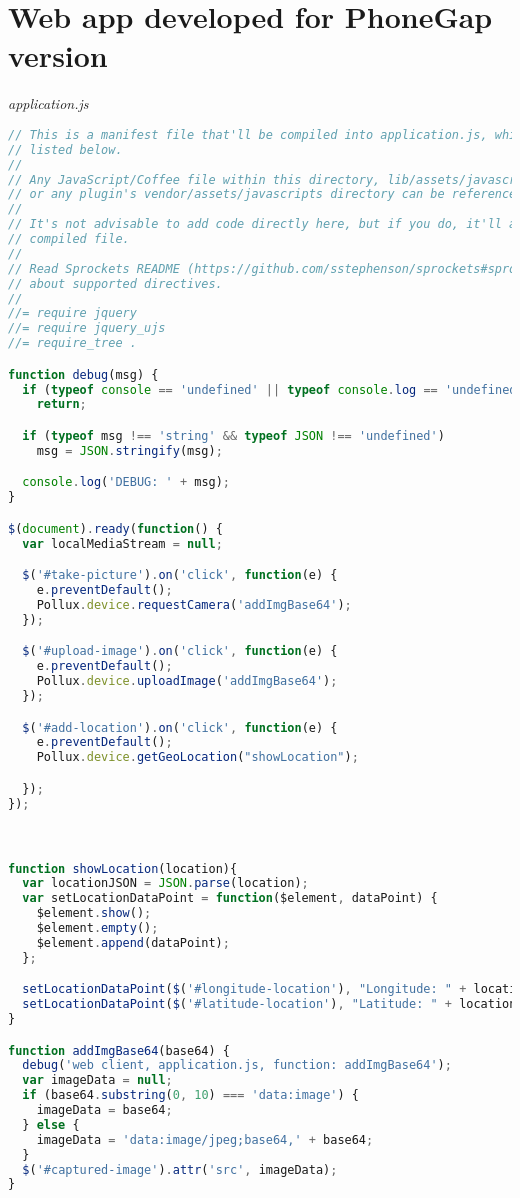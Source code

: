 \section{Web app developed for PhoneGap version} \label{App:AppendixD}
\emph{application.js}
\begin{lstlisting}[language=JavaScript]
// This is a manifest file that'll be compiled into application.js, which will include all the files
// listed below.
//
// Any JavaScript/Coffee file within this directory, lib/assets/javascripts, vendor/assets/javascripts,
// or any plugin's vendor/assets/javascripts directory can be referenced here using a relative path.
//
// It's not advisable to add code directly here, but if you do, it'll appear at the bottom of the
// compiled file.
//
// Read Sprockets README (https://github.com/sstephenson/sprockets#sprockets-directives) for details
// about supported directives.
//
//= require jquery
//= require jquery_ujs
//= require_tree .

function debug(msg) {
  if (typeof console == 'undefined' || typeof console.log == 'undefined')
    return;

  if (typeof msg !== 'string' && typeof JSON !== 'undefined')
    msg = JSON.stringify(msg);

  console.log('DEBUG: ' + msg);
}

$(document).ready(function() {
  var localMediaStream = null;

  $('#take-picture').on('click', function(e) {
    e.preventDefault();
    Pollux.device.requestCamera('addImgBase64');
  });

  $('#upload-image').on('click', function(e) {
    e.preventDefault();
    Pollux.device.uploadImage('addImgBase64');
  });

  $('#add-location').on('click', function(e) {
    e.preventDefault();
    Pollux.device.getGeoLocation("showLocation");

  });
});



function showLocation(location){
  var locationJSON = JSON.parse(location);
  var setLocationDataPoint = function($element, dataPoint) {
    $element.show();
    $element.empty();
    $element.append(dataPoint);
  };

  setLocationDataPoint($('#longitude-location'), "Longitude: " + locationJSON.longitude);
  setLocationDataPoint($('#latitude-location'), "Latitude: " + locationJSON.latitude);
}

function addImgBase64(base64) {
  debug('web client, application.js, function: addImgBase64');
  var imageData = null;
  if (base64.substring(0, 10) === 'data:image') {
    imageData = base64;
  } else {
    imageData = 'data:image/jpeg;base64,' + base64;
  }
  $('#captured-image').attr('src', imageData);
}
\end{lstlisting}
